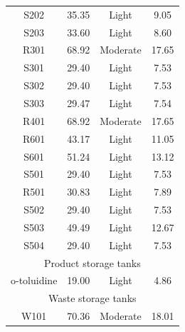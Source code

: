 \begin{table}[H]
\begin{tabular}{cccc}
S202                    & 35.35          & Light                     & 9.05                               \\
S203                    & 33.60          & Light                     & 8.60                               \\
R301                    & 68.92          & Moderate                  & 17.65                              \\
S301                    & 29.40          & Light                     & 7.53                               \\
S302                    & 29.40          & Light                     & 7.53                               \\
S303                    & 29.47          & Light                     & 7.54                               \\
R401                    & 68.92          & Moderate                  & 17.65                              \\
R601                    & 43.17          & Light                     & 11.05                              \\
S601                    & 51.24          & Light                     & 13.12                              \\
S501                    & 29.40          & Light                     & 7.53                               \\
R501                    & 30.83          & Light                     & 7.89                               \\
S502                    & 29.40          & Light                     & 7.53                               \\
S503                    & 49.49          & Light                     & 12.67                              \\
S504                    & 29.40          & Light                     & 7.53                               \\\hline
\multicolumn{4}{c}{Product   storage tanks}                                                      \\\hline
o-toluidine             & 19.00          & Light                     & 4.86                               \\\hline
\multicolumn{4}{c}{Waste   storage tanks}                                                        \\\hline
W101                    &   70.36           &     Moderate                      &   18.01                                 \\

\end{tabular}
\end{table}
